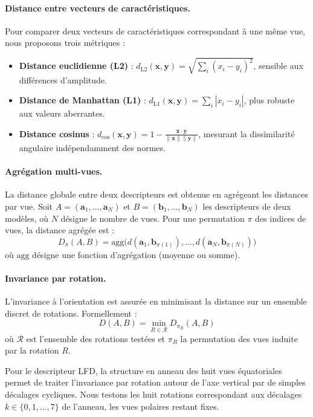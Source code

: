 \documentclass[11pt,a4paper,oneside]{report}
\begin{document}
\paragraph{Distance entre vecteurs de caractéristiques.} Pour comparer deux vecteurs de caractéristiques correspondant à une même vue, nous proposons trois métriques :

\begin{itemize}
    \item \textbf{Distance euclidienne (L2)} : $d_{\text{L2}}(\mathbf{x}, \mathbf{y}) = \sqrt{\sum_{i}(x_i - y_i)^2}$, sensible aux différences d'amplitude.
    \item \textbf{Distance de Manhattan (L1)} : $d_{\text{L1}}(\mathbf{x}, \mathbf{y}) = \sum_{i}|x_i - y_i|$, plus robuste aux valeurs aberrantes.
    \item \textbf{Distance cosinus} : $d_{\cos}(\mathbf{x}, \mathbf{y}) = 1 - \frac{\mathbf{x} \cdot \mathbf{y}}{\|\mathbf{x}\| \|\mathbf{y}\|}$, mesurant la dissimilarité angulaire indépendamment des normes.
\end{itemize}

\paragraph{Agrégation multi-vues.} La distance globale entre deux descripteurs est obtenue en agrégeant les distances par vue. Soit $A = (\mathbf{a}_1, \ldots, \mathbf{a}_N)$ et $B = (\mathbf{b}_1, \ldots, \mathbf{b}_N)$ les descripteurs de deux modèles, où $N$ désigne le nombre de vues. Pour une permutation $\pi$ des indices de vues, la distance agrégée est :
$$D_\pi(A, B) = \text{agg}\big(d(\mathbf{a}_1, \mathbf{b}_{\pi(1)}), \ldots, d(\mathbf{a}_N, \mathbf{b}_{\pi(N)})\big)$$
où $\text{agg}$ désigne une fonction d'agrégation (moyenne ou somme).

\paragraph{Invariance par rotation.} L'invariance à l'orientation est assurée en minimisant la distance sur un ensemble discret de rotations. Formellement :
$$D(A, B) = \min_{R \in \mathcal{R}} D_{\pi_R}(A, B)$$
où $\mathcal{R}$ est l'ensemble des rotations testées et $\pi_R$ la permutation des vues induite par la rotation $R$.

Pour le descripteur LFD, la structure en anneau des huit vues équatoriales permet de traiter l'invariance par rotation autour de l'axe vertical par de simples décalages cycliques. Nous testons les huit rotations correspondant aux décalages $k \in \{0, 1, \ldots, 7\}$ de l'anneau, les vues polaires restant fixes.
\end{document}
